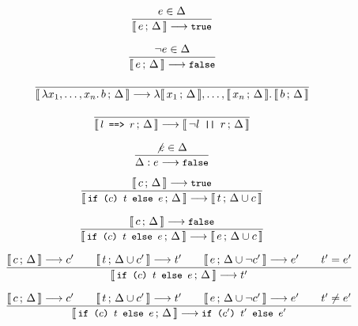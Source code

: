 \begin{figure}
\begin{framed}
 
\begin{equation}
\dfrac{
  e \in \Delta
}{
  \llbracket\, e\,;\, \Delta\, \rrbracket \longrightarrow \texttt{\small{true}}
}
\end{equation}

\begin{equation}
\dfrac{
  \neg e \in \Delta
}{
  \llbracket\, e\,;\, \Delta\, \rrbracket \longrightarrow \texttt{\small{false}}
}
\end{equation}

\begin{equation}
\dfrac{
  \empty
}{
  \lb{\lambda x_1, \ldots, x_n.\, b}{\Delta} \longrightarrow \lambda \lb{x_1}{\Delta}, \ldots, \lb{x_n}{\Delta}.\, \lb{b}{\Delta}
}
\end{equation}

\begin{equation}
\dfrac{
  \empty
}{
  \lb{\stt{$l$ ==> $r$}}{\Delta} \longrightarrow \lb{\neg l \stt{ || } r}{\Delta}
}
\end{equation}

\begin{equation}
\dfrac{
  \not e \in \Delta
}{
  \Delta: e \longrightarrow \texttt{\small{false}}
}
\end{equation}


\begin{equation}
\dfrac{
  \llbracket\, c\,;\, \Delta\, \rrbracket \longrightarrow \texttt{\small{true}}
}{
  \llbracket\, \texttt{\small{if ($c$) $t$ else $e$}}\,;\, \Delta\, \rrbracket \longrightarrow \llbracket\, t\,;\, \Delta \cup c\, \rrbracket
}
\end{equation}

\begin{equation}
\dfrac{
  \llbracket\, c\,;\, \Delta\, \rrbracket \longrightarrow \texttt{\small{false}}
}{
  \llbracket\, \texttt{\small{if ($c$) $t$ else $e$}}\,;\, \Delta\, \rrbracket \longrightarrow \llbracket\, e\,;\, \Delta \cup c\, \rrbracket
}
\end{equation}

\begin{equation}
\dfrac{
  \llbracket\, c\,;\, \Delta\, \rrbracket \longrightarrow c' \qquad
  \llbracket\, t\,;\, \Delta \cup c'\, \rrbracket \longrightarrow t' \qquad
  \llbracket\, e\,;\, \Delta \cup \neg c'\, \rrbracket \longrightarrow e' \qquad
  t' = e'
}{
  \llbracket\, \texttt{\small{if ($c$) $t$ else $e$}}\,;\, \Delta\, \rrbracket \longrightarrow t'
}
\end{equation}

\begin{equation}
\dfrac{
  \llbracket\, c\,;\, \Delta\, \rrbracket \longrightarrow c' \qquad
  \llbracket\, t\,;\, \Delta \cup c'\, \rrbracket \longrightarrow t' \qquad
  \llbracket\, e\,;\, \Delta \cup \neg c'\, \rrbracket \longrightarrow e' \qquad
  t' \not= e'
}{
  \llbracket\, \texttt{\small{if ($c$) $t$ else $e$}}\,;\, \Delta\, \rrbracket \longrightarrow \texttt{\small{if ($c'$) $t'$ else $e'$}}
}
\end{equation}


\end{framed}
\end{figure}
